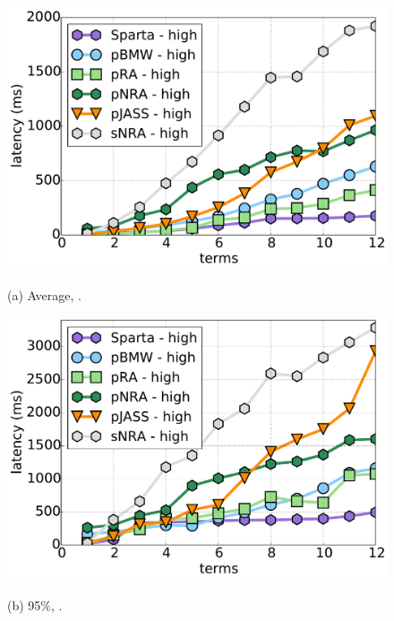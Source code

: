 {{\begin{figure}[tbh]
\begin{minipage}{0.33\textwidth}
         \includegraphics[width=\textwidth]{figures/latency_12threads_clueweb.pdf}
         \centerline{(a) Average, \cw.}
\end{minipage}
\begin{minipage}{0.33\textwidth}
    	\includegraphics[width=\textwidth]{figures/latency_95th_percentile_clueweb.pdf}
    	         \centerline{(b) 95\%, \cw.}
\end{minipage}
 \begin{minipage}{0.33\textwidth}

\end{minipage}
\end{figure}}}
